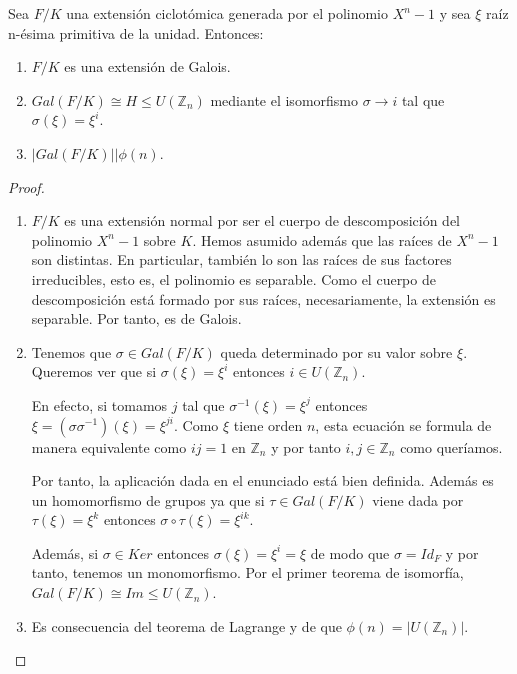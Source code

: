 \begin{theorem}
Sea $F/K$ una extensión ciclotómica generada por el polinomio $X^n-1$ y sea $\xi$ raíz n-ésima primitiva de la unidad. Entonces:

\begin{enumerate}
\item $F/K$ es una extensión de Galois. 
\item $Gal(F/K) \cong H \le U(\mathbb{Z}_n)$ mediante el isomorfismo $\sigma \to i$ tal que $\sigma(\xi) = \xi^i$.
\item $|Gal(F/K)| | \phi(n)$. 
\end{enumerate}
\end{theorem}
\begin{proof}
\begin{enumerate}
\item $F/K$ es una extensión normal por ser el cuerpo de descomposición del polinomio $X^n - 1$ sobre $K$. Hemos asumido además que las raíces de $X^n - 1$ son distintas. En particular, también lo son las raíces de sus factores irreducibles, esto es, el polinomio es separable. Como el cuerpo de descomposición está formado por sus raíces, necesariamente, la extensión es separable. Por tanto, es de Galois. 

\item  Tenemos que $\sigma \in Gal(F/K)$ queda determinado por su valor sobre $\xi$. Queremos ver que si $\sigma(\xi) = \xi^i$ entonces $i \in U(\mathbb{Z}_n)$. 

En efecto, si tomamos $j$ tal que $\sigma^{-1}(\xi) = \xi^j$ entonces $\xi = (\sigma \sigma^{-1})( \xi) = \xi^{ji}$. Como $\xi$ tiene orden $n$, esta ecuación se formula de manera equivalente como $ij = 1$ en $\mathbb{Z}_n$ y por tanto $i,j \in \mathbb{Z}_n$ como queríamos. 

Por tanto, la aplicación dada en el enunciado está bien definida. Además es un homomorfismo de grupos ya que si $\tau \in Gal(F/K)$ viene dada por $\tau(\xi) = \xi^k$ entonces $\sigma \circ \tau (\xi) = \xi^{ik}$. 

Además, si $\sigma \in Ker$ entonces $\sigma(\xi) = \xi^i = \xi$ de modo que $\sigma = Id_F$ y por tanto, tenemos un monomorfismo. Por el primer teorema de isomorfía, $Gal(F/K) \cong Im \le U(\mathbb{Z}_n)$.

\item Es consecuencia del teorema de Lagrange y de que $\phi(n) = |U(\mathbb{Z}_n)|$. 
\end{enumerate}
\end{proof}

